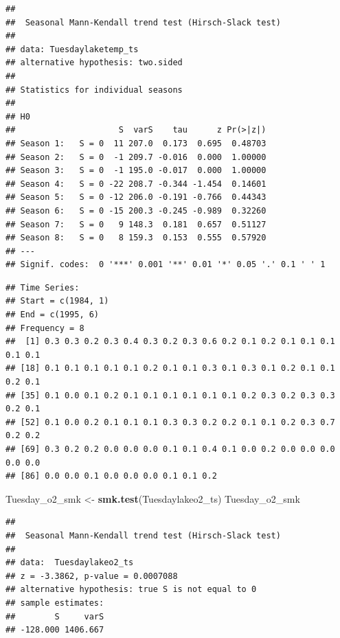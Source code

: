 \documentclass[12pt,]{article}
\newenvironment{Shaded}{\begin{snugshade}}{\end{snugshade}}
\newcommand{\KeywordTok}[1]{\textcolor[rgb]{0.13,0.29,0.53}{\textbf{#1}}}
\newcommand{\DataTypeTok}[1]{\textcolor[rgb]{0.13,0.29,0.53}{#1}}
\newcommand{\DecValTok}[1]{\textcolor[rgb]{0.00,0.00,0.81}{#1}}
\newcommand{\StringTok}[1]{\textcolor[rgb]{0.31,0.60,0.02}{#1}}
\newcommand{\OperatorTok}[1]{\textcolor[rgb]{0.81,0.36,0.00}{\textbf{#1}}}
\newcommand{\NormalTok}[1]{#1}
\begin{document}
\begin{verbatim}
## 
##  Seasonal Mann-Kendall trend test (Hirsch-Slack test)
## 
## data: Tuesdaylaketemp_ts
## alternative hypothesis: two.sided
## 
## Statistics for individual seasons
## 
## H0
##                     S  varS    tau      z Pr(>|z|)  
## Season 1:   S = 0  11 207.0  0.173  0.695  0.48703  
## Season 2:   S = 0  -1 209.7 -0.016  0.000  1.00000  
## Season 3:   S = 0  -1 195.0 -0.017  0.000  1.00000  
## Season 4:   S = 0 -22 208.7 -0.344 -1.454  0.14601  
## Season 5:   S = 0 -12 206.0 -0.191 -0.766  0.44343  
## Season 6:   S = 0 -15 200.3 -0.245 -0.989  0.32260  
## Season 7:   S = 0   9 148.3  0.181  0.657  0.51127  
## Season 8:   S = 0   8 159.3  0.153  0.555  0.57920  
## ---
## Signif. codes:  0 '***' 0.001 '**' 0.01 '*' 0.05 '.' 0.1 ' ' 1
\end{verbatim}

\begin{Shaded}
\end{Shaded}

\begin{verbatim}
## Time Series:
## Start = c(1984, 1) 
## End = c(1995, 6) 
## Frequency = 8 
##  [1] 0.3 0.3 0.2 0.3 0.4 0.3 0.2 0.3 0.6 0.2 0.1 0.2 0.1 0.1 0.1 0.1 0.1
## [18] 0.1 0.1 0.1 0.1 0.1 0.2 0.1 0.1 0.3 0.1 0.3 0.1 0.2 0.1 0.1 0.2 0.1
## [35] 0.1 0.0 0.1 0.2 0.1 0.1 0.1 0.1 0.1 0.1 0.2 0.3 0.2 0.3 0.3 0.2 0.1
## [52] 0.1 0.0 0.2 0.1 0.1 0.1 0.3 0.3 0.2 0.2 0.1 0.1 0.2 0.3 0.7 0.2 0.2
## [69] 0.3 0.2 0.2 0.0 0.0 0.0 0.1 0.1 0.4 0.1 0.0 0.2 0.0 0.0 0.0 0.0 0.0
## [86] 0.0 0.0 0.1 0.0 0.0 0.0 0.1 0.1 0.2
\end{verbatim}

\begin{Shaded}
\begin{Highlighting}[]
\NormalTok{Tuesday_o2_smk <-}\StringTok{ }\KeywordTok{smk.test}\NormalTok{(Tuesdaylakeo2_ts)}
\NormalTok{Tuesday_o2_smk}
\end{Highlighting}
\end{Shaded}

\begin{verbatim}
## 
##  Seasonal Mann-Kendall trend test (Hirsch-Slack test)
## 
## data:  Tuesdaylakeo2_ts
## z = -3.3862, p-value = 0.0007088
## alternative hypothesis: true S is not equal to 0
## sample estimates:
##        S     varS 
## -128.000 1406.667
\end{verbatim}
\end{document}
